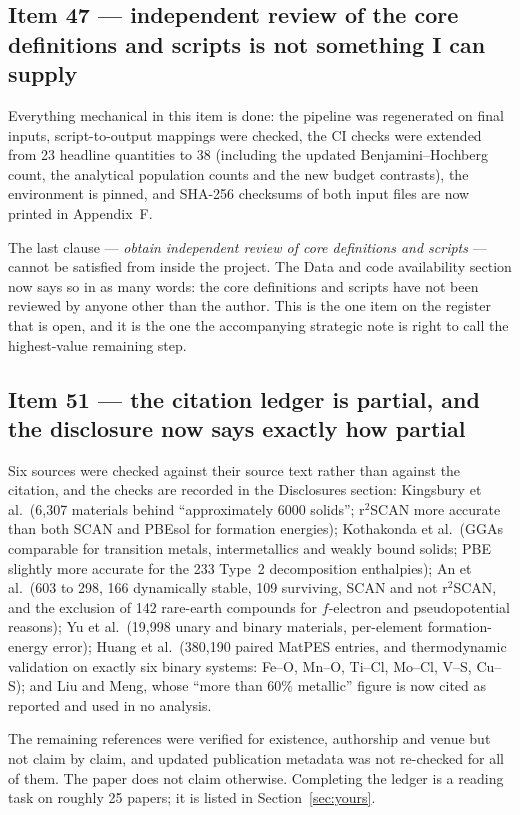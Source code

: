 \documentclass[11pt]{article}
\begin{document}
\subsection*{Item 47 --- independent review of the core definitions and scripts is not something I can supply}

Everything mechanical in this item is done: the pipeline was regenerated on final inputs,
script-to-output mappings were checked, the CI checks were extended from 23 headline
quantities to 38 (including the updated Benjamini--Hochberg count, the analytical population
counts and the new budget contrasts), the environment is pinned, and SHA-256 checksums of
both input files are now printed in Appendix~F.

The last clause --- \emph{obtain independent review of core definitions and scripts} ---
cannot be satisfied from inside the project. The Data and code availability section now says
so in as many words: the core definitions and scripts have not been reviewed by anyone other
than the author. This is the one item on the register that is open, and it is the one the
accompanying strategic note is right to call the highest-value remaining step.

\subsection*{Item 51 --- the citation ledger is partial, and the disclosure now says exactly how partial}

Six sources were checked against their source text rather than against the citation, and the
checks are recorded in the Disclosures section: Kingsbury et al.\ (6{,}307 materials behind
``approximately 6000 solids''; r$^2$SCAN more accurate than both SCAN and PBEsol for
formation energies); Kothakonda et al.\ (GGAs comparable for transition metals,
intermetallics and weakly bound solids; PBE slightly more accurate for the 233 Type~2
decomposition enthalpies); An et al.\ (603 to 298, 166 dynamically stable, 109 surviving,
SCAN and not r$^2$SCAN, and the exclusion of 142 rare-earth compounds for $f$-electron and
pseudopotential reasons); Yu et al.\ (19{,}998 unary and binary materials, per-element
formation-energy error); Huang et al.\ (380{,}190 paired MatPES entries, and thermodynamic
validation on exactly six binary systems: Fe--O, Mn--O, Ti--Cl, Mo--Cl, V--S, Cu--S); and
Liu and Meng, whose ``more than 60\% metallic'' figure is now cited as reported and used in
no analysis.

The remaining references were verified for existence, authorship and venue but not claim by
claim, and updated publication metadata was not re-checked for all of them. The paper does
not claim otherwise. Completing the ledger is a reading task on roughly 25 papers; it is
listed in Section~\ref{sec:yours}.
\end{document}

